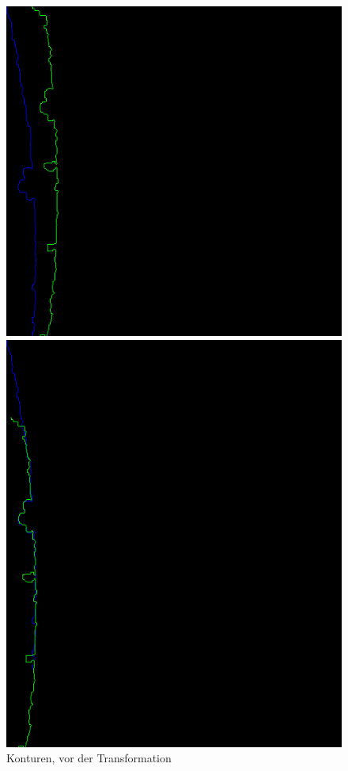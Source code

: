 \documentclass[../main.tex]{subfiles}
\begin{document}
\begin{figure}[h]
    \centering
    \begin{minipage}{0.49\textwidth}
        \centering
        \includegraphics[width=\textwidth]{images/before_matching.png} %
        \caption{Konturen, vor der Transformation}
        \label{fig:before_matching}
    \end{minipage}
    \begin{minipage}{0.49\textwidth}
        \centering
        \includegraphics[width=\textwidth]{images/0.24225865209471767contours.png} %

\end{minipage}
\end{figure}
\end{document}
